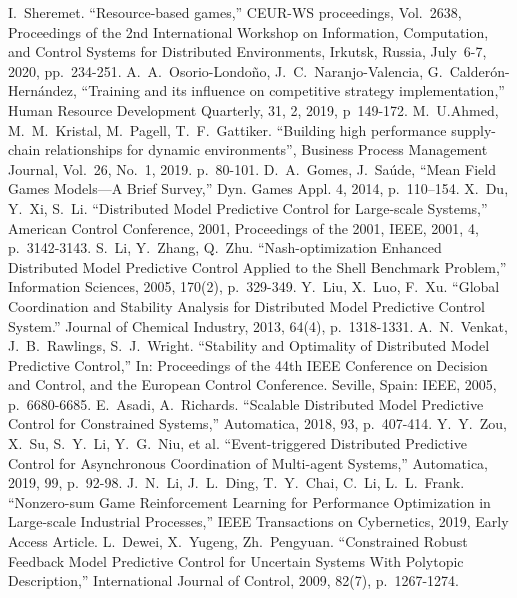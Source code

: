 \documentclass[conference]{IEEEtran}
\begin{document}
\begin{thebibliography}{999}

     I.~Sheremet. ``Resource-based games,'' CEUR-WS proceedings, Vol.~2638, Proceedings of the 2nd International Workshop on Information, Computation, and Control Systems for Distributed Environments, Irkutsk, Russia, July~6-7, 2020, pp.~234-251.
     A.~A.~Osorio-Londoño, J.~C.~Naranjo-Valencia, G.~Calderón-Hernández, ``Training and its influence on competitive strategy implementation,'' Human Resource Development Quarterly, 31, 2, 2019, p~149-172. 
    M.~U.Ahmed, M.~M.~Kristal, M.~Pagell, T.~F.~Gattiker. ``Building high performance supply-chain relationships for dynamic environments'', Business Process Management Journal, Vol.~26, No.~1, 2019. p.~80-101. 
      D.~A.~Gomes, J.~Saúde, ``Mean Field Games Models—A Brief Survey,'' Dyn. Games Appl. 4, 2014, p.~110–154. 
     X.~Du, Y.~Xi, S.~Li. ``Distributed Model Predictive Control for Large-scale Systems,'' American Control Conference, 2001, Proceedings of the 2001, IEEE, 2001, 4, p.~3142-3143.
     S.~Li, Y.~Zhang, Q.~Zhu. ``Nash-optimization Enhanced Distributed Model Predictive Control Applied to the Shell Benchmark Problem,'' Information Sciences, 2005, 170(2), p.~329-349.
     Y.~Liu, X.~Luo, F.~Xu. ``Global Coordination and Stability Analysis for Distributed Model Predictive Control System.'' Journal of Chemical Industry, 2013, 64(4), p.~1318-1331.
     A.~N.~Venkat, J.~B.~Rawlings, S.~J.~Wright. ``Stability and Optimality of Distributed Model Predictive Control,'' In: Proceedings of the 44th IEEE Conference on Decision and Control, and the European Control Conference. Seville, Spain: IEEE, 2005, p.~6680-6685.
     E.~Asadi, A.~Richards. ``Scalable Distributed Model Predictive Control for Constrained Systems,'' Automatica, 2018, 93, p.~407-414.
     Y.~Y.~Zou, X.~Su, S.~Y.~Li, Y.~G.~Niu, et al. ``Event-triggered Distributed Predictive Control for Asynchronous Coordination of Multi-agent Systems,'' Automatica, 2019, 99, p.~92-98.
     J.~N.~Li, J.~L.~Ding, T.~Y.~Chai, C.~Li, L.~L.~Frank. ``Nonzero-sum Game Reinforcement Learning for Performance Optimization in Large-scale Industrial Processes,'' IEEE Transactions on Cybernetics, 2019, Early Access Article.
     L.~Dewei, X.~Yugeng, Zh.~Pengyuan. ``Constrained Robust Feedback Model Predictive Control for Uncertain Systems With Polytopic Description,'' International Journal of Control, 2009, 82(7), p.~1267-1274.

\end{thebibliography}
\end{document}
